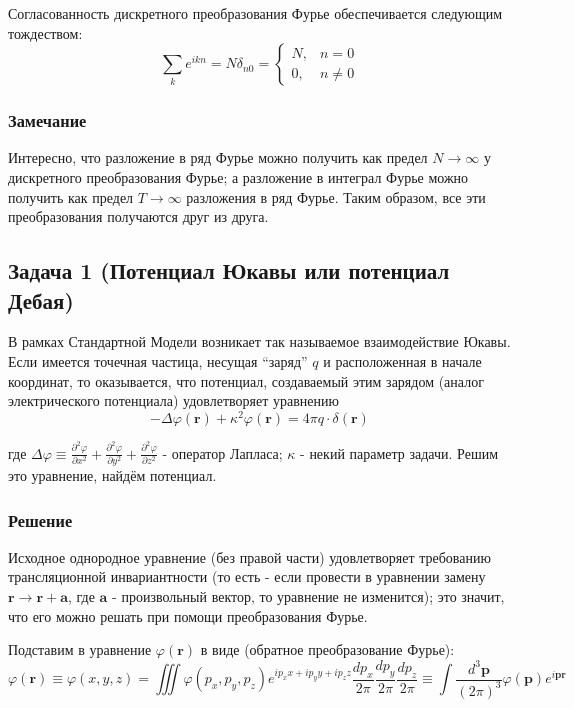 \documentclass[a4paper,12pt]{article}
\begin{document}
\noindent
Согласованность дискретного преобразования Фурье обеспечивается следующим
тождеством:
\[
\sum_{k}e^{ikn}=N\delta_{n0}=\begin{cases}
N, & n=0\\
0, & n\neq0
\end{cases}
\]



\subsubsection*{Замечание}

Интересно, что разложение в ряд Фурье можно получить как предел $N\to\infty$
у дискретного преобразования Фурье; а разложение в интеграл Фурье
можно получить как предел $T\to\infty$ разложения в ряд Фурье. Таким
образом, все эти преобразования получаются друг из друга.


\subsection*{Задача 1 (Потенциал Юкавы или потенциал Дебая)}

В рамках Стандартной Модели возникает так называемое взаимодействие
Юкавы. Если имеется точечная частица, несущая ``заряд'' $q$ и расположенная
в начале координат, то оказывается, что потенциал, создаваемый этим
зарядом (аналог электрического потенциала) удовлетворяет уравнению
\[
-\Delta\varphi(\mathbf{r})+\kappa^{2}\varphi(\mathbf{r})=4\pi q\cdot\delta(\mathbf{r})
\]


\noindent
где $\Delta\varphi\equiv\frac{\partial^{2}\varphi}{\partial x^{2}}+\frac{\partial^{2}\varphi}{\partial y^{2}}+\frac{\partial^{2}\varphi}{\partial z^{2}}$
- оператор Лапласа; $\kappa$ - некий параметр задачи. Решим это уравнение,
найдём потенциал.


\subsubsection*{Решение}

Исходное однородное уравнение (без правой части) удовлетворяет требованию
трансляционной инвариантности (то есть - если провести в уравнении
замену $\mathbf{r}\rightarrow\mathbf{r}+\mathbf{a}$, где $\mathbf{a}$
- произвольный вектор, то уравнение не изменится); это значит, что
его можно решать при помощи преобразования Фурье.

\noindent
Подставим в уравнение $\varphi(\mathbf{r})$ в виде (обратное преобразование
Фурье):
\[
\varphi(\mathbf{r})\equiv\varphi(x,y,z)=\iiint\varphi(p_{x},p_{y},p_{z})e{}^{ip_{x}x+ip_{y}y+ip_{z}z}\frac{dp_{x}}{2\pi}\frac{dp_{y}}{2\pi}\frac{dp_{z}}{2\pi}\equiv\int\frac{d^{3}\mathbf{p}}{(2\pi)^{3}}\varphi(\mathbf{p})e^{i\mathbf{p}\mathbf{r}}
\]
\end{document}
